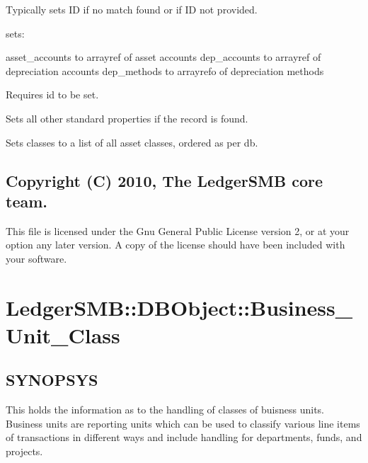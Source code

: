 \begin{description}
\begin{description}
\begin{description}
\begin{description}
\begin{description}
\begin{description}
\begin{description}
\begin{description}
\begin{description}
\begin{description}
\begin{description}
Typically sets ID if no match found or if ID not provided.


\item[{get\_metadata}] \mbox{}

sets:



asset\_accounts to arrayref of asset accounts
dep\_accounts to arrayref of depreciation accounts
dep\_methods to arrayrefo of depreciation methods


\item[{get\_asset\_class()}] \mbox{}

Requires id to be set.



Sets all other standard properties if the record is found.


\item[{list\_asset\_classes}] \mbox{}

Sets classes to a list of all asset classes, ordered as per db.

\end{description}
\subsection*{Copyright (C) 2010, The LedgerSMB core team.\label{LedgerSMB::DBObject::Asset_Class_Copyright_C_2010_The_LedgerSMB_core_team_}}


This file is licensed under the Gnu General Public License version 2, or at your
option any later version.  A copy of the license should have been included with
your software.

\section{LedgerSMB::DBObject::Business\_Unit\_Class\label{LedgerSMB::DBObject::Business_Unit_Class}}




\subsection*{SYNOPSYS\label{LedgerSMB::DBObject::Business_Unit_Class_SYNOPSYS}}


This holds the information as to the handling of classes of buisness units.  
Business units are reporting units which can be used to classify various line 
items of transactions in different ways and include handling for departments, 
funds, and projects.


\end{description}
\end{description}
\end{description}
\end{description}
\end{description}
\end{description}
\end{description}
\end{description}
\end{description}
\end{description}
